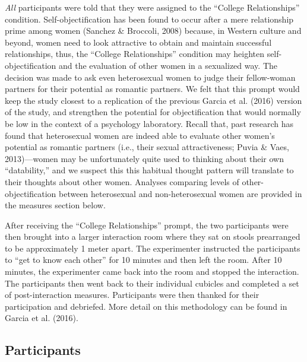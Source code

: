 \documentclass[man]{apa6}
\begin{document}
\emph{All} participants were told that they were assigned to the
\enquote{College Relationships} condition. Self-objectification has been
found to occur after a mere relationship prime among women (Sanchez \&
Broccoli, 2008) because, in Western culture and beyond, women need to
look attractive to obtain and maintain successful relationships, thus,
the \enquote{College Relationships} condition may heighten
self-objectification and the evaluation of other women in a sexualized
way. The decision was made to ask even heterosexual women to judge their
fellow-woman partners for their potential as romantic partners. We felt
that this prompt would keep the study closest to a replication of the
previous Garcia et al. (2016) version of the study, and strengthen the
potential for objectification that would normally be low in the context
of a psychology laboratory. Recall that, past research has found that
heterosexual women are indeed able to evaluate other women's potential
as romantic partners (i.e., their sexual attractiveness; Puvia \& Vaes,
2013)---women may be unfortunately quite used to thinking about their
own \enquote{datability,} and we suspect this this habitual thought
pattern will translate to their thoughts about other women. Analyses
comparing levels of other-objectification between heterosexual and
non-heterosexual women are provided in the measures section below.

After receiving the \enquote{College Relationships} prompt, the two
participants were then brought into a larger interaction room where they
sat on stools prearranged to be approximately 1 meter apart. The
experimenter instructed the participants to \enquote{get to know each
other} for 10 minutes and then left the room. After 10 minutes, the
experimenter came back into the room and stopped the interaction. The
participants then went back to their individual cubicles and completed a
set of post-interaction measures. Participants were then thanked for
their participation and debriefed. More detail on this methodology can
be found in Garcia et al. (2016).

\subsection{Participants}\label{participants}
\end{document}

